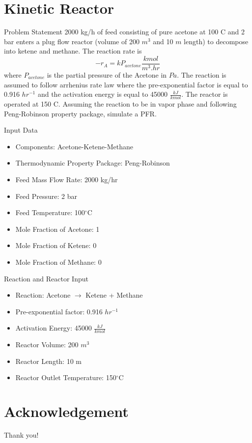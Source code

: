 \documentclass[10pt]{beamer}
\begin{document}
\section{Kinetic Reactor}
\begin{frame}{Problem Statement}
	2000 kg/h of feed consisting of pure acetone at 100 \degree C and 2 bar enters a plug flow reactor (volume of 200 $m^3$ and 10 $m$ length) to decompose into ketene and methane. The reaction rate is 
	\begin{equation*}
		-r_A = kP_{acetone} \frac{kmol}{m^3.hr}
	\end{equation*}
	where $P_{acetone}$ is the partial pressure of the Acetone in $Pa$. The reaction is assumed to follow arrhenius rate law where the pre-exponential factor is equal to 0.916 $hr^{-1}$ and the activation energy is equal to
	45000 $\frac{kJ}{kmol}$. The reactor is operated at 150 \degree C. Assuming the reaction to be in vapor phase and following
	Peng-Robinson property package, simulate a PFR.
\end{frame}

\begin{frame}{Input Data}
	\begin{itemize}
		\item Components: Acetone-Ketene-Methane
		\item Thermodynamic Property Package: Peng-Robinson
		\item Feed Mass Flow Rate: 2000 kg/hr
		\item Feed Pressure: 2 bar
		\item Feed Temperature: 100$^\circ$C
		\item Mole Fraction of Acetone: 1
		\item Mole Fraction of Ketene: 0
		\item Mole Fraction of Methane: 0
	\end{itemize}
\end{frame}

\begin{frame}{Reaction and Reactor Input}
	\begin{itemize}
		\item Reaction: Acetone $\rightarrow$ Ketene + Methane
		\item Pre-exponential factor: 0.916 $hr^{-1}$
		\item Activation Energy: 45000 $\frac{kJ}{kmol}$
		\item Reactor Volume: 200 $m^3$
		\item Reactor Length: 10 m
		\item Reactor Outlet Temperature: 150$^\circ$C
	\end{itemize}
\end{frame}
 
	\section*{Acknowledgement}  
	\begin{frame}
		
		\textcolor{myNewColorA}{\huge{\centerline{Thank you!}}}
		\vspace*{0.5cm}
		
		
	\end{frame}
	
\end{document}

